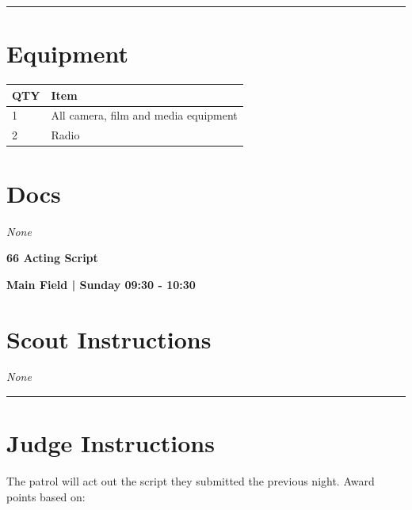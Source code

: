 \documentclass[10pt]{article}
\newcommand{\newtitle}[1]{\begin{center}{\Huge\bfseries #1 }\\ \vspace{5mm}\end{center}}
\newcommand{\newsubtitle}[1]{\begin{center}{\color{grey}\Large\bfseries #1 }\\ \vspace{5mm}\end{center}}
\begin{document}
			\vspace{0.5cm}
	\hrule
	\vspace{0.5cm}

	\begin{multicols}{2}

		\section*{\faWrench \: Equipment}

		
	\begin{center}
			\begin{tabular}{p{2cm}p{4cm}}


				\textbf{QTY} & \textbf{Item} \\\toprule
												1&All camera, film and media equipment\\\midrule
												2&Radio\\\midrule
								\end{tabular}

			\end{center}

		
		\vfill\null
		\columnbreak

			\section*{\faFile \: Docs}
		 	\textit{None}
	

		\vfill\null

		\end{multicols}



	\vspace{1cm}


	\clearpage
		\newtitle{66 Acting Script }
	\newsubtitle{Main Field | Sunday 09:30 - 10:30}
		\setcounter{section}{65}
	\section*{Scout Instructions}
		\textit{None}
	
	\vspace{0.5cm}
	\hrule
	\vspace{0.5cm}

		\section*{Judge Instructions}
		The patrol will act out the script they submitted the previous night. Award points based on:
\end{document}
